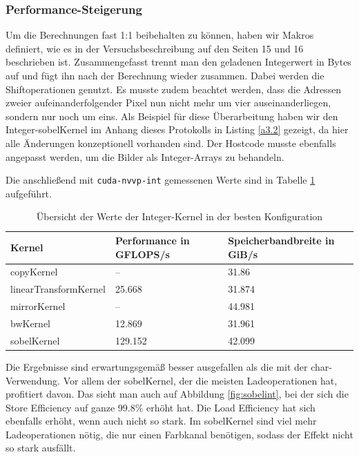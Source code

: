 \documentclass[12pt,a4paper]{scrartcl}
\begin{document}
\subsubsection{Performance-Steigerung}
Um die Berechnungen fast 1:1 beibehalten zu k\"onnen, haben wir Makros definiert, wie es in der Versuchsbeschreibung auf den Seiten 15 und 16 beschrieben ist.
Zusammengefasst trennt man den geladenen Integerwert in Bytes auf und f\"ugt ihn nach der Berechnung wieder zusammen.
Dabei werden die Shiftoperationen genutzt.
Es musste zudem beachtet werden, dass die Adressen zweier aufeinanderfolgender Pixel nun nicht mehr um vier auseinanderliegen, sondern nur noch um eins.
Als Beispiel f\"ur diese \"Uberarbeitung haben wir den Integer-sobelKernel im Anhang dieses Protokolls in Listing \ref{a3.2} gezeigt, da hier alle \"Anderungen konzeptionell vorhanden sind.
Der Hostcode musste ebenfalls angepasst werden, um die Bilder als Integer-Arrays zu behandeln.

Die anschlie\ss{}end mit \texttt{cuda-nvvp-int} gemessenen Werte sind in Tabelle \ref{tab:perf-int} aufgef\"uhrt.

\begin{table}[h]
    \centering
    \begin{tabular}{l|l|l}
    \hline
    Kernel & Performance in GFLOPS/s & Speicherbandbreite in GiB/s \\
    \hline
    copyKernel & --                  & 31.86  \\
    linearTransformKernel & 25.668   & 31.874 \\
    mirrorKernel & --                & 44.981 \\
    bwKernel & 12.869                & 31.961 \\
    sobelKernel & 129.152            & 42.099 \\
    \hline
    \end{tabular}
    \caption{\"Ubersicht der Werte der Integer-Kernel in der besten Konfiguration}
    \label{tab:perf-int}
\end{table}

Die Ergebnisse sind erwartungsgem\"a\ss{} besser ausgefallen als die mit der char-Verwendung.
Vor allem der sobelKernel, der die meisten Ladeoperationen hat, profitiert davon.
Das sieht man auch auf Abbildung \ref{fig:sobelint}, bei der sich die Store Efficiency auf ganze 99.8\% erh\"oht hat.
Die Load Efficiency hat sich ebenfalls erh\"oht, wenn auch nicht so stark.
Im sobelKernel sind viel mehr Ladeoperationen n\"otig, die nur einen Farbkanal ben\"otigen, sodass der Effekt nicht so stark ausf\"allt.
\end{document}
